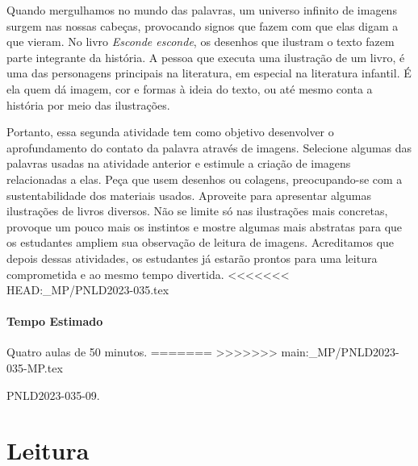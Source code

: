 \documentclass[11pt]{extarticle}
\begin{document}

Quando mergulhamos no mundo das palavras, um universo infinito de imagens surgem nas nossas cabeças, provocando signos que fazem com que elas digam a que vieram. No livro \textit{Esconde esconde}, os desenhos que ilustram o texto fazem parte integrante da história. A pessoa que executa uma ilustração de um livro, é uma das personagens principais na literatura, em especial na literatura infantil. É ela quem dá imagem, cor e formas à ideia do texto, ou até mesmo conta a história por meio das ilustrações. 

Portanto, essa segunda atividade tem como objetivo desenvolver o aprofundamento do contato da palavra através de imagens. Selecione algumas das palavras usadas na atividade anterior e estimule a criação de imagens relacionadas a elas. Peça que usem desenhos ou colagens, preocupando-se com a sustentabilidade dos materiais usados. Aproveite para apresentar algumas ilustrações de livros diversos. Não se limite só nas ilustrações mais concretas, provoque um pouco mais os instintos e mostre algumas mais abstratas para que os estudantes ampliem sua observação de leitura de imagens. Acreditamos que depois dessas atividades, os estudantes já estarão prontos para uma leitura comprometida e ao mesmo tempo divertida. 
<<<<<<< HEAD:_MP/PNLD2023-035.tex

\paragraph{Tempo Estimado} Quatro aulas de 50 minutos. 
=======
>>>>>>> main:_MP/PNLD2023-035-MP.tex

PNLD2023-035-09.

\section{Leitura}

\end{document}
